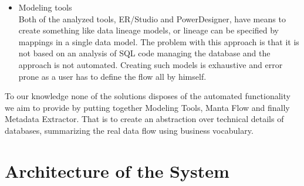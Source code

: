 \begin{itemize}
	\item Modeling tools \\
	Both of the analyzed tools, ER/Studio and PowerDesigner, have means to create something like data lineage models, or lineage can be specified by mappings in a single data model. The problem with this approach is that it is not based on an analysis of SQL code managing the database and the approach is not automated. Creating such models is exhaustive and error prone as a user has to define the flow all by himself. 
\end{itemize}


To our knowledge none of the solutions disposes of the automated functionality we aim to provide by putting together Modeling Tools, Manta Flow and finally Metadata Extractor. That is to create an abstraction over technical details of databases, summarizing the real data flow using business vocabulary.

\section{Architecture of the System}


